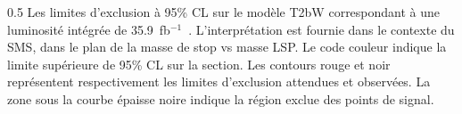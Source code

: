 

                 {0.5}       %
                 { Les limites d'exclusion à 95\% CL sur le modèle T2bW correspondant à une luminosité intégrée de 35.9~fb$^{-1}$~\cite{Sirunyan: 2017xse}. L'interprétation est fournie dans le contexte du SMS, dans le plan de la masse de stop vs masse LSP. Le code couleur indique la limite supérieure de 95\% CL sur la section. Les contours rouge et noir représentent respectivement les limites d'exclusion attendues et observées. La zone sous la courbe épaisse noire indique la région exclue des points de signal. }


